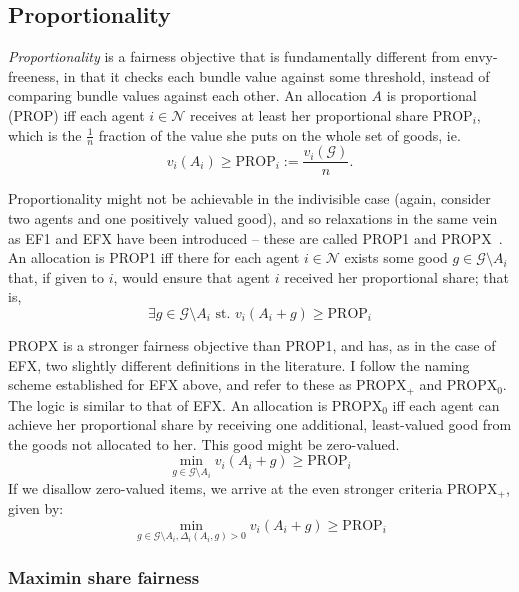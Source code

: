 \subsection{Proportionality}
\textit{Proportionality} is a fairness objective that is fundamentally different from envy-freeness, in that it checks each bundle value against some threshold, instead of comparing bundle values against each other. An allocation $A$ is proportional (PROP) iff each agent $i\in \mathcal{N}$ receives at least her proportional share PROP$_i$, which is the $\frac{1}{n}$ fraction of the value she puts on the whole set of goods, ie.
\begin{equation}\tag{PROP}
  v_i(A_i)\geq \text{PROP}_i := \frac{v_i(\mathcal{G})}{n}.
\end{equation}

Proportionality might not be achievable in the indivisible case (again, consider two agents and one positively valued good), and so relaxations in the same vein as EF1 and EFX have been introduced -- these are called PROP1 and PROPX~\cite{amanatidis2022fair}. An allocation is PROP1 iff there for each agent $i \in \mathcal{N}$ exists some good $g\in \mathcal{G}\setminus A_i$ that, if given to $i$, would ensure that agent $i$ received her proportional share; that is, 
\begin{equation}\tag{PROP1}
  \exists g\in \mathcal{G}\setminus A_i\text{ st. }v_i(A_i+g)\geq\text{PROP}_i
\end{equation}

PROPX is a stronger fairness objective than PROP1, and has, as in the case of EFX, two slightly different definitions in the literature. I follow the naming scheme established for EFX above, and refer to these as PROPX$_+$ and PROPX$_0$. The logic is similar to that of EFX. An allocation is PROPX$_0$ iff each agent can achieve her proportional share by receiving one additional, least-valued good from the goods not allocated to her. This good might be zero-valued.
\begin{equation}\tag{PROPX$_0$}
  \min_{g\in \mathcal{G}\setminus A_i}v_i(A_i + g)\geq\text{PROP}_i
\end{equation}
If we disallow zero-valued items, we arrive at the even stronger criteria PROPX$_+$, given by:
\begin{equation}\tag{PROPX$_+$}
  \min_{g\in \mathcal{G}\setminus A_i, \Delta_i(A_i, g)>0}v_i(A_i + g)\geq\text{PROP}_i
\end{equation}

\subsubsection*{Maximin share fairness}

